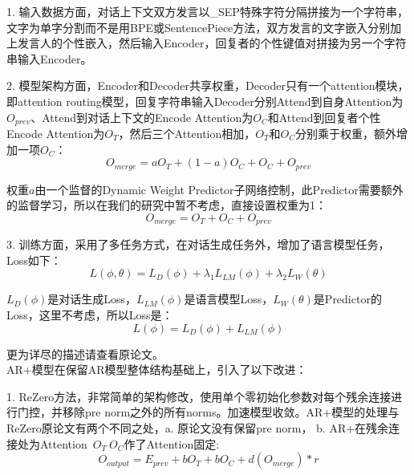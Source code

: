 \documentclass[letterpaper]{article} %
\DeclareRobustCommand{\citeext}[1]{\cite[#1]{#1}}
\begin{document}
\begin{CJK*}{UTF8}{gbsn}
1. 输入数据方面，对话上下文双方发言以\_SEP特殊字符分隔拼接为一个字符串，文字为单字分割而不是用BPE或SentencePiece方法，双方发言的文字嵌入分别加上发言人的个性嵌入，然后输入Encoder，回复者的个性键值对拼接为另一个字符串输入Encoder。

2. 模型架构方面，Encoder和Decoder共享权重，Decoder只有一个attention模块，即attention routing模型，回复字符串输入Decoder分别Attend到自身Attention为\\$O_{prev}$、Attend到对话上下文的Encode Attention为$O_C$和Attend到回复者个性Encode Attention为$O_T$，然后三个Attention相加，$O_T$和$O_C$分别乘于权重，额外增加一项$O_C$：
\begin{equation}
O_{merge} = aO_T + (1 - a)O_C + O_C + O_{prev}    
\end{equation}

权重$a$由一个监督的Dynamic Weight Predictor子网络控制，此Predictor需要额外的监督学习，所以在我们的研究中暂不考虑，直接设置权重为1：
\begin{equation}
O_{merge} = O_T + O_C + O_{prev}    
\end{equation}

3. 训练方面，采用了多任务方式，在对话生成任务外，增加了语言模型任务，Loss如下：
\begin{equation}
L(\phi, \theta) = L_D(\phi) + \lambda_1L_{LM}(\phi) + \lambda_2L_W(\theta)
\end{equation}

$L_D(\phi)$是对话生成Loss，$L_{LM}(\phi)$是语言模型Loss，$L_W(\theta)$是Predictor的Loss，这里不考虑，所以Loss是：
\begin{equation}
L(\phi) = L_D(\phi) + L_{LM}(\phi)
\end{equation}

更为详尽的描述请查看原论文\citeext{Zheng2019}。\\

AR+模型在保留AR模型整体结构基础上，引入了以下改进：

1. ReZero\citeext{Bachlechner2020}方法，非常简单的架构修改，使用单个零初始化参数对每个残余连接进行门控，并移除pre norm之外的所有norms。加速模型收敛。AR+模型的处理与ReZero原论文有两个不同之处，a. 原论文没有保留pre norm， b. AR+在残余连接处为Attention~$O_T~O_C$作了Attention固定:
\begin{equation}
O_{output} = E_{prev} + bO_T + bO_C + d(O_{merge}) * r
\end{equation}


\end{CJK*}
\end{document}
